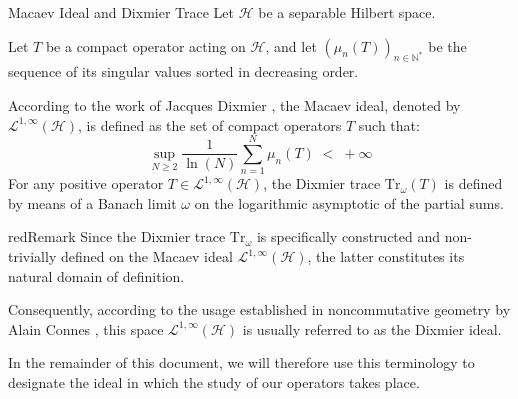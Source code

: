 \documentclass[Riemann_Hypothesis.tex]{subfiles}
\begin{document}
\begin{DefNefEn}[label=df:IdealDixmierMacaev]{Macaev Ideal and Dixmier Trace}
    Let $\mathcal{H}$ be a separable Hilbert space. \par
    Let $T$ be a compact operator acting on $\mathcal{H}$, and let 
    $(\mu_n(T))_{n \in \mathbb{N}^*}$ be the sequence of its singular values sorted 
    in decreasing order. \par
    According to the work of Jacques Dixmier \cite{dixmier1966_trace_en}, 
    the Macaev ideal, denoted by $\mathcal{L}^{1,\infty}(\mathcal{H})$, is defined as 
    the set of compact operators $T$ such that:
    \begin{equation*}
        \sup_{N \geq 2} \frac{1}{\ln(N)} \sum_{n=1}^{N} \mu_n(T) \;<\; +\infty
    \end{equation*}
    For any positive operator $T \in \mathcal{L}^{1,\infty}(\mathcal{H})$, the Dixmier 
    trace $\mathrm{Tr}_\omega(T)$ is defined by means of a Banach limit $\omega$ on the 
    logarithmic asymptotic of the partial sums.
\end{DefNefEn}

\begin{ppbox}{red}{Remark}
    Since the Dixmier trace $\mathrm{Tr}_\omega$ is specifically constructed and 
    non-trivially defined on the Macaev ideal $\mathcal{L}^{1,\infty}(\mathcal{H})$, 
    the latter constitutes its natural domain of definition. \par
    Consequently, according to the usage established in noncommutative geometry by 
    Alain Connes \cite{connes1999_trace_en}, this space $\mathcal{L}^{1,\infty}
    (\mathcal{H})$ is usually referred to as the Dixmier ideal. \par
    In the remainder of this document, we will therefore use this terminology to 
    designate the ideal in which the study of our operators takes place.
\end{ppbox}
\end{document}
